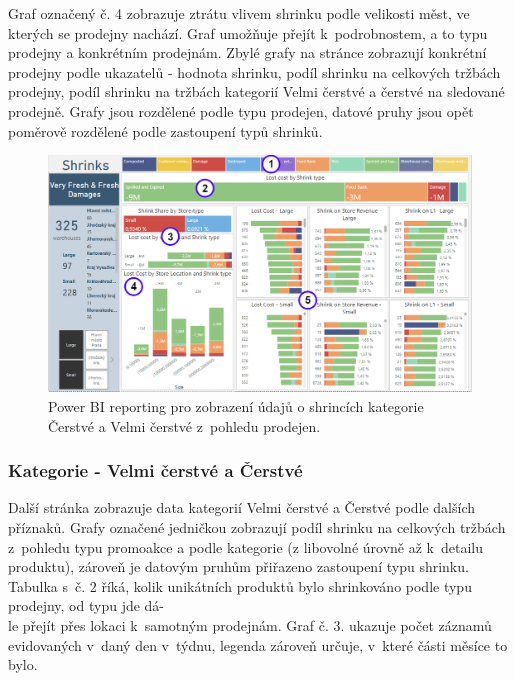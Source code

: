 Graf označený č. 4 zobrazuje ztrátu vlivem shrinku podle velikosti měst, ve kterých se prodejny nachází. Graf umožňuje přejít k~podrobnostem, a to typu prodejny a konkrétním prodejnám. Zbylé grafy na stránce zobrazují konkrétní prodejny podle ukazatelů - hodnota shrinku, podíl shrinku na celkových tržbách prodejny, podíl shrinku na tržbách kategorií Velmi čerstvé a čerstvé na sledované prodejně. Grafy jsou rozdělené podle typu prodejen, datové pruhy jsou opět poměrově rozdělené podle zastoupení typů shrinků.

\begin{figure}[h!]
    \centering
    \captionsetup{justification=centering}
    \includegraphics[width=\textwidth]{obrazky/PBI/storesSFF.png}
    \caption{Power BI reporting pro zobrazení údajů o shrincích kategorie \\ Čerstvé a Velmi čerstvé z~pohledu prodejen.}
    \label{obr:PBI:storesSFF}
\end{figure}

\subsubsection*{Kategorie - Velmi čerstvé a Čerstvé}

Další stránka zobrazuje data kategorií Velmi čerstvé a Čerstvé podle dalších příznaků. Grafy označené jedničkou zobrazují podíl shrinku na celkových tržbách z~pohledu typu promoakce a podle kategorie (z libovolné úrovně až k~detailu produktu), zároveň je datovým pruhům přiřazeno zastoupení typu shrinku. Tabulka s~č. 2 říká, kolik unikátních produktů bylo shrinkováno podle typu prodejny, od typu jde dá-\\le přejít přes lokaci k~samotným prodejnám. Graf č. 3. ukazuje počet záznamů evidovaných v~daný den v~týdnu, legenda zároveň určuje, v~které části měsíce to bylo. 

